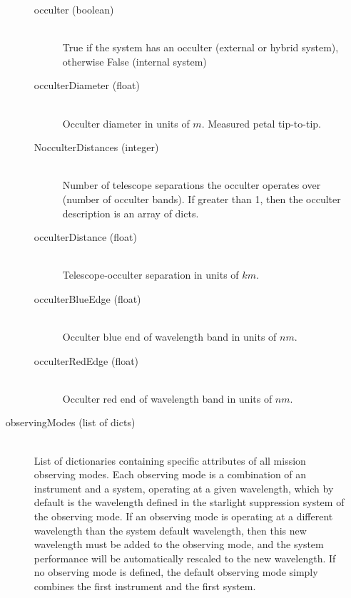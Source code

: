 \documentclass[cleanfoot]{asme2ej}
\begin{document}
\begin{itemize}
\begin{description}
\begin{description}
        \item[occulter (boolean)] \hfill \\ True if the system has an occulter (external or hybrid system), otherwise False (internal system)
        \item[occulterDiameter (float)]\hfill \\ Occulter diameter in units of $ m $.  Measured petal tip-to-tip.
        \item [NocculterDistances (integer)]\hfill \\ Number of telescope separations the occulter operates over (number of occulter bands). If greater than 1, then the occulter description is an array of dicts.
        \item[occulterDistance (float)] \hfill \\ Telescope-occulter separation in units of $km$.
        \item[occulterBlueEdge (float)]\hfill \\ Occulter blue end of wavelength band in units of $nm$.
        \item[occulterRedEdge (float)]\hfill \\ Occulter red end of wavelength band in units of $nm$.
    \end{description}
    \item[observingModes (list of dicts)]\hfill \\ List of dictionaries containing specific attributes of all mission observing modes. Each observing mode is a combination of an instrument and a system, operating at a given wavelength, which by default is the wavelength defined in the starlight suppression system of the observing mode. If an observing mode is operating at a different wavelength than the system default wavelength, then this new wavelength must be added to the observing mode, and the system performance will be automatically rescaled to the new wavelength. If no observing mode is defined, the default observing mode simply combines the first instrument and the first system.
    

\end{description}
\end{itemize}
\end{document}
